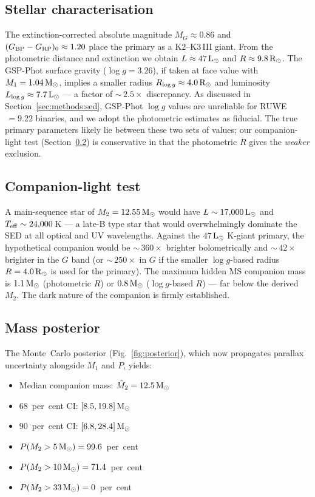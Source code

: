 \documentclass[usenatbib,fleqn]{mnras}
\newcommand{\Msun}{{\rm M}_\odot}
\newcommand{\Lsun}{{\rm L}_\odot}
\newcommand{\Rsun}{{\rm R}_\odot}
\begin{document}
\subsection{Stellar characterisation}
\label{sec:results:stellar}

The extinction-corrected absolute magnitude
$M_G \approx 0.86$ and
$(G_{\rm BP} - G_{\rm RP})_0 \approx 1.20$ place the primary as a
K2--K3\,III giant.  From the photometric distance and extinction we
obtain $L \approx 47\,\Lsun$ and $R \approx 9.8\,\Rsun$.  The
GSP-Phot surface gravity ($\log g = 3.26$), if taken at face value
with $M_1 = 1.04\,\Msun$, implies a smaller radius
$R_{\log g} \approx 4.0\,\Rsun$ and luminosity
$L_{\log g} \approx 7.7\,\Lsun$ --- a factor of
$\sim$\,$2.5\times$ discrepancy.  As discussed in
Section~\ref{sec:methods:sed}, GSP-Phot $\log g$ values are
unreliable for RUWE$\,= 9.22$ binaries, and we adopt the
photometric estimates as fiducial.  The true primary parameters
likely lie between these two sets of values; our companion-light
test (Section~\ref{sec:results:companion}) is conservative in that
the photometric $R$ gives the \emph{weaker} exclusion.

\subsection{Companion-light test}
\label{sec:results:companion}

A main-sequence star of $M_2 = 12.55\,\Msun$ would have
$L \sim 17{,}000\,\Lsun$ and $T_{\rm eff} \sim 24{,}000$\,K ---
a late-B type star that would overwhelmingly dominate the SED at
all optical and UV wavelengths.  Against the $47\,\Lsun$ K-giant
primary, the hypothetical companion would be
$\sim$\,$360\times$ brighter bolometrically and
$\sim$\,$42\times$ brighter in the $G$ band
(or $\sim$\,$250\times$ in $G$ if the smaller $\log g$-based
radius $R = 4.0\,\Rsun$ is used for the primary).  The maximum
hidden MS companion mass is
$1.1\,\Msun$ (photometric $R$) or $0.8\,\Msun$
($\log g$-based $R$) --- far below the derived $M_2$.  The
dark nature of the companion is firmly established.

\subsection{Mass posterior}
\label{sec:results:posterior}

The Monte~Carlo posterior (Fig.~\ref{fig:posterior}), which now
propagates parallax uncertainty alongside $M_1$ and $P$, yields:
\begin{itemize}
\item Median companion mass: $\tilde{M}_2 = 12.5\,\Msun$
\item 68~per~cent CI: $[8.5, 19.8]\,\Msun$
\item 90~per~cent CI: $[6.8, 28.4]\,\Msun$
\item $P(M_2 > 5\,\Msun) = 99.6$~per~cent
\item $P(M_2 > 10\,\Msun) = 71.4$~per~cent
\item $P(M_2 > 33\,\Msun) = 0$~per~cent
\end{itemize}
\end{document}
